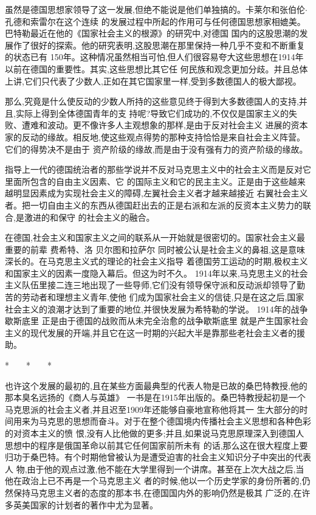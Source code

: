 ﻿\documentclass[12pt]{article}
\begin{document}
虽然是德国思想家领导了这一发展,但绝不能说是他们单独搞的。卡莱尔和张伯伦$\cdot$孔德和索雷尔在这个连续
的发展过程中所起的作用可与任何德国思想家相媲美。巴特勒最近在他的《国家社会主义的根源》的研究中,对德国
国内的这股思潮的发展作了很好的探索。他的研究表明,这股思潮在那里保持一种几乎不变和不断重复的状态已有
150年。这种情况虽然相当可怕,但人们很容易夸大这些思想在1914年以前在德国的重要性。其实,这些思想比其它任
何民族和观念更加分歧。并且总体上讲,它们只代表了少数人,正如在其它国家里一样,受到多数德国人的极大鄙视。

那么,究竟是什么使反动的少数人所持的这些意见终于得到大多数德国人的支持,并且,实际上得到全体德国青年的支
持呢?导致它们成功的,不仅仅是国家主义的失败、遭难和波动。更不像许多人主观想象的那样,是由于反对社会主义
进展的资本家的反动的缘故。相反地,使这些观点得势的那种支持恰恰是来自社会主义阵营。它们的得势决不是由于
资产阶级的缘故,而是由于没有强有力的资产阶级的缘故。

指导上一代的德国统治者的那些学说并不反对马克思主义中的社会主义而是反对它里面所包含的自由主义因素、它
的国际主义和它的民主主义。正是由于这些越来越明显因素成为实现社会主义的障碍,左翼社会主义者才越来越接近
右翼社会主义者。把一切自由主义的东西从德国赶出去的正是右派和左派的反资本主义势力的联合,是激进的和保守
的社会主义的融合。

在德国,社会主义和国家主义之间的联系从一开始就是很密切的。国家社会主义最重要的前辈 \myrule 费希特、洛
贝尔图和拉萨尔 \myrule 同时被公认是社会主义的鼻祖,这是意味深长的。在马克思主义式的理论的社会主义指导
着德国劳工运动的时期,极权主义和国家主义的因素一度隐入幕后。但这为时不久。 1914年以来,马克思主义的社会
主义队伍里接二连三地出现了一些导师,它们没有领导保守派和反动派却领导了勤苦的劳动者和理想主义青年,使他
们成为国家社会主义的信徒,只是在这之后,国家社会主义的浪潮才达到了重要的地位,并很快发展为希特勒的学说。
1914年的战争歇斯底里 \myrule 正是由于德国的战败而从未完全治愈的战争歇斯底里 \myrule 就是产生国家社会
主义的现代发展的开端,并且它在这一时期的兴起大半是靠那些老社会主义者的援助。

*　　*　　*

也许这个发展的最初的,且在某些方面最典型的代表人物是已故的桑巴特教授,他的那本臭名远扬的《商人与英雄》
一书是在1915年出版的。桑巴特教授起初是一个马克思派的社会主义者,并且迟至1909年还能够自豪地宣称他将其一
生大部分的时间用来为马克思的思想而奋斗。对于在整个德国境内传播社会主义思想和各种色彩的对资本主义的愤
恨,没有人比他做的更多;并且,如果说马克思原理深入到德国人思想中的程序是俄国革命以前其它任何国家前所未有
的话,那么这在很大程度上要归功于桑巴特。有个时期他曾被认为是遭受迫害的社会主义知识分子中突出的代表人
物,由于他的观点过激,他不能在大学里得到一个讲席。甚至在上次大战之后,当他在政治上已不再是一个马克思主义
者的时候,他以一个历史学家的身份所著的,仍然保持马克思主义者的态度的那本书,在德国国内外的影响仍然是极其
广泛的,在许多英美国家的计划者的著作中尤为显著。
\end{document}
